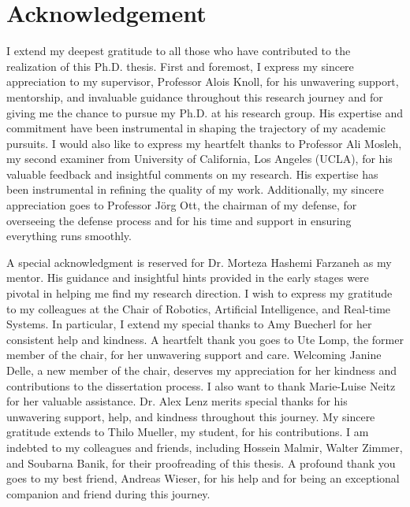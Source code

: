         \newpage
        \thispagestyle{empty}\vspace*{2cm}%

        \section*{{Acknowledgement}}%

        I extend my deepest gratitude to all those who have contributed to the realization of this Ph.D. thesis.
        First and foremost, I express my sincere appreciation to my supervisor, Professor Alois Knoll, for his unwavering support, mentorship, and invaluable guidance throughout this research journey and for giving me the chance to pursue my Ph.D. at his research group. His expertise and commitment have been instrumental in shaping the trajectory of my academic pursuits. I would also like to express my heartfelt thanks to Professor Ali Mosleh, my second examiner from University of California, Los Angeles (UCLA), for his valuable feedback and insightful comments on my research. His expertise has been instrumental in refining the quality of my work. Additionally, my sincere appreciation goes to Professor Jörg Ott, the chairman of my defense, for overseeing the defense process and for his time and support in ensuring everything runs smoothly.

        
        A special acknowledgment is reserved for Dr. Morteza Hashemi Farzaneh as my mentor. His guidance and insightful hints provided in the early stages were pivotal in helping me find my research direction.
        I wish to express my gratitude to my colleagues at the Chair of Robotics, Artificial Intelligence, and Real-time Systems. In particular, I extend my special thanks to Amy Buecherl for her consistent help and kindness. A heartfelt thank you goes to Ute Lomp, the former member of the chair, for her unwavering support and care. Welcoming Janine Delle, a new member of the chair, deserves my appreciation for her kindness and contributions to the dissertation process. I also want to thank Marie-Luise Neitz for her valuable assistance. Dr. Alex Lenz merits special thanks for his unwavering support, help, and kindness throughout this journey. My sincere gratitude extends to Thilo Mueller, my student, for his contributions. I am indebted to my colleagues and friends, including Hossein Malmir, Walter Zimmer, and Soubarna Banik, for their proofreading of this thesis. A profound thank you goes to my best friend, Andreas Wieser, for his help and for being an exceptional companion and friend during this journey.

